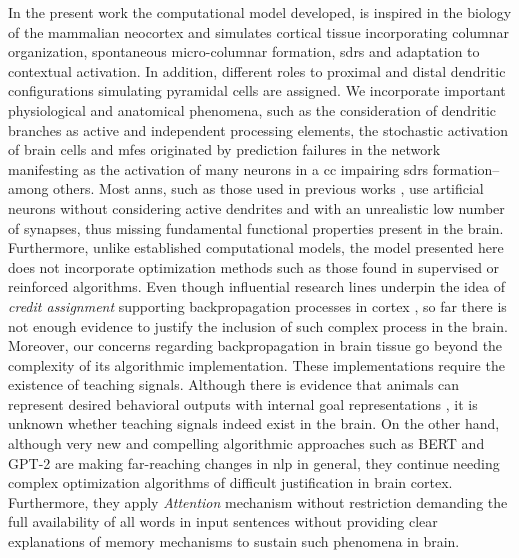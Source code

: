 {In the present work the computational model developed, is inspired in the biology of the mammalian neocortex and simulates cortical tissue incorporating columnar organization, spontaneous micro-columnar formation, \glspl{sdr} and adaptation to contextual activation. In addition, different roles to proximal and distal dendritic configurations simulating pyramidal cells are assigned. We incorporate important physiological and anatomical phenomena, such as the consideration of dendritic branches as active and independent processing elements, the stochastic activation of brain cells and \glspl{mfe} originated by prediction failures in the network manifesting as the activation of many neurons in a \gls{cc} impairing \glspl{sdr} formation--among others. Most \glspl{ann}, such as those used in previous works \cite{STJOHN1990217, rabovsky_modelling_2018, Dominey2009NeuralNP, michalon_meaning-driven_2019}, use artificial neurons without considering active dendrites and with an unrealistic low number of synapses, thus missing fundamental functional properties present in the brain. Furthermore, unlike established computational models, the model presented here does not incorporate optimization methods such as those found in supervised or reinforced algorithms. Even though influential research lines underpin the idea of \emph{credit assignment} supporting backpropagation processes in cortex \cite{10.7554/eLife.22901}, so far there is not enough evidence to justify the inclusion of such complex process in the brain. Moreover, our concerns regarding backpropagation in brain tissue go beyond the complexity of its algorithmic implementation. These implementations require the existence of teaching signals. Although there is evidence that animals can represent desired behavioral outputs with internal goal representations \cite{gadagkar_dopamine_2016}, it is unknown whether teaching signals indeed exist in the brain.
On the other hand, although very new and compelling algorithmic approaches such as BERT \cite{DBLP:journals/corr/abs-1810-04805} and GPT-2 \cite{radford_language_nodate, DBLP:journals/corr/VaswaniSPUJGKP17} are making far-reaching changes in \gls{nlp} in general, they continue needing complex optimization algorithms of difficult justification in brain cortex. Furthermore, they apply \emph{Attention} mechanism without restriction demanding the full availability of all words in input sentences without providing clear explanations of memory mechanisms to sustain such phenomena in brain.

}
